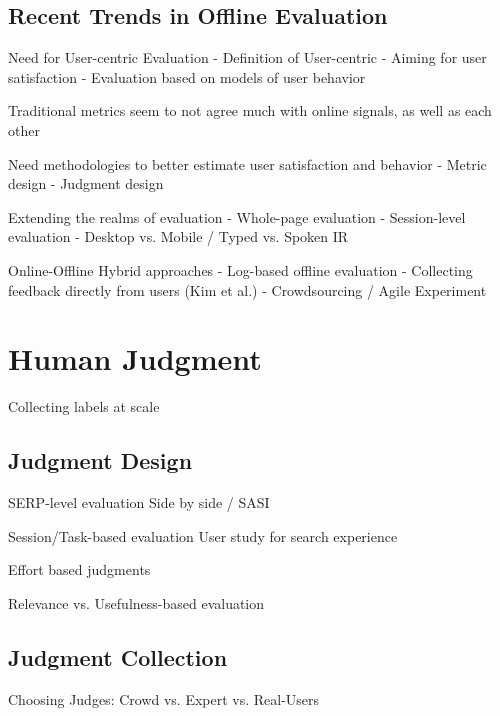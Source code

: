 \documentclass[openany]{now} %
\begin{document}
	\section{Recent Trends in Offline Evaluation}
	
	Need for User-centric Evaluation
	- Definition of User-centric
	- Aiming for user satisfaction
	- Evaluation based on models of user behavior
	
	Traditional metrics seem to not agree much with online signals, as well as each other
	\cite{radl:comp10}
	
	
	Need methodologies to better estimate user satisfaction and behavior
	-	Metric design
	-	Judgment design
	
	
	Extending the realms of evaluation
	-	Whole-page evaluation
	-	Session-level evaluation
	-	Desktop vs. Mobile / Typed vs. Spoken IR
	\cite{Bailey2010} \cite{Thomas2006} \cite{CarteretteBCD08}
	
	Online-Offline Hybrid approaches
	- Log-based offline evaluation \cite{Li:2015} \cite{li2010contextual}
	- Collecting feedback directly from users (Kim et al.)
	- Crowdsourcing / Agile Experiment
	
	\chapter{Human Judgment}
	Collecting labels at scale
	
	\section{Judgment Design}
	
	SERP-level evaluation 
	Side by side / SASI
	\cite{Thomas2006}
	\cite{Chandar2013} \cite{Al-Maskari2007} 
	\cite{Bailey2010} \cite{CarteretteBCD08}
	
	Session/Task-based evaluation
	User study for search experience
	
	Effort based judgments \cite{Yilmaz:2014}
	
	Relevance vs. Usefulness-based evaluation 
	
	\section{Judgment Collection}
	
	Choosing Judges: 
	Crowd vs. Expert vs. Real-Users \cite{Scholer:2013} \cite{Kazai:2013} \cite{Alonso20121053}
	
\end{document}
